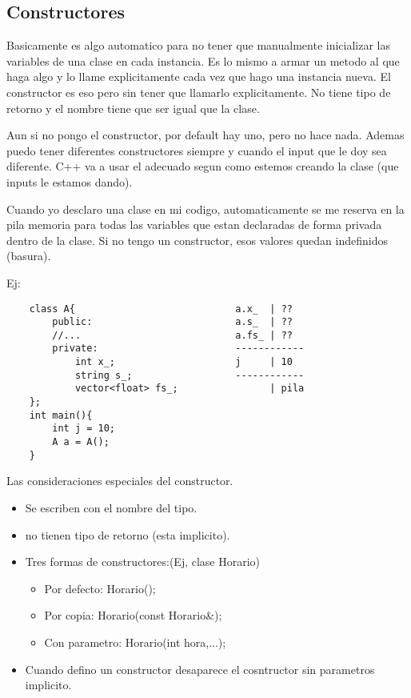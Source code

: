 \documentclass[11pt]{article}
\begin{document}
\subsection{Constructores}
Basicamente es algo automatico para no tener que manualmente inicializar las
variables de una clase en cada instancia.
Es lo mismo a armar un metodo al que haga algo y lo llame explicitamente cada
vez que hago una instancia nueva.
El constructor es eso pero sin tener que llamarlo explicitamente.
No tiene tipo de retorno y el nombre tiene que ser igual que la clase.

Aun si no pongo el constructor, por default hay uno, pero no hace nada.
Ademas puedo tener diferentes constructores siempre y cuando el input que le
doy sea diferente.
C++ va a usar el adecuado segun como estemos creando la clase (que inputs le
estamos dando).

Cuando yo desclaro una clase en mi codigo, automaticamente se me reserva en la pila
memoria para todas las variables que estan declaradas de forma privada dentro de
la clase.
Si no tengo un constructor, esos valores quedan indefinidos (basura).

Ej:

\begin{lstlisting}
    class A{                            a.x_  | ??
        public:                         a.s_  | ??
        //...                           a.fs_ | ??
        private:                        ------------
            int x_;                     j     | 10
            string s_;                  ------------
            vector<float> fs_;                | pila
    };
    int main(){
        int j = 10;
        A a = A();
    }
\end{lstlisting}
Las consideraciones especiales del constructor.
\begin{itemize}
    \item Se escriben con el nombre del tipo.
    \item no tienen tipo de retorno (esta implicito).
    \item Tres formas de constructores:(Ej, clase Horario)
        \begin{itemize}
            \item Por defecto: Horario();
            \item Por copia: Horario(const Horario\&);
            \item Con parametro: Horario(int hora,...);
        \end{itemize}
    \item Cuando defino un constructor desaparece el cosntructor sin parametros
            implicito.
\end{itemize}
\end{document}
